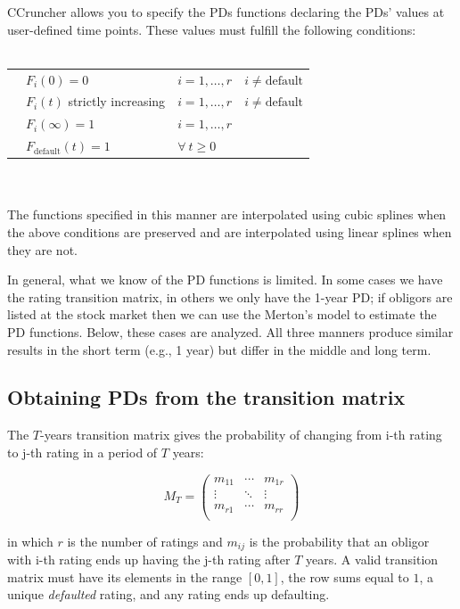 \documentclass[11pt,fleqn]{book} %
\begin{document}
CCruncher allows you to specify the PDs functions declaring the PDs' values 
at user-defined time points. These values must fulfill the following conditions:
~\\
~\\
\begin{listliketab} 
	\begin{tabular}{Lll}
		\textbullet & $F_i(0) = 0$                 & $i=1,\dots,r \quad i \ne \text{default}$ \\
		\textbullet & $F_i(t)$ strictly increasing & $i=1,\dots,r \quad i \ne \text{default}$ \\
		\textbullet & $F_i(\infty) = 1$            & $i=1,\dots,r$ \\
		\textbullet & $F_{\text{default}}(t) = 1$  & $\forall\ t \ge 0$ \\
	\end{tabular} 
\end{listliketab}
~\\
~\\
The functions specified in this manner are interpolated using cubic splines
when the above conditions are preserved and are interpolated using linear 
splines when they are not.

In general, what we know of the PD functions is limited. In some cases we have 
the rating transition matrix, in others we only have the 1-year PD; if obligors 
are listed at the stock market then we can use the Merton's model to estimate the 
PD functions. Below, these cases are analyzed. All three manners produce 
similar results in the short term (e.g., 1 year) but differ in the middle and
long term.

\subsection{Obtaining PDs from the transition matrix}
\label{pdftm}

\begin{definition}
	\label{def:tm}
	The $T$-years transition matrix gives the probability of changing 
	from i-th rating to j-th rating in a period of $T$ years:
	{\small
	\begin{displaymath}
		M_T = \left(
		\begin{array}{ccc}
			m_{11} & \cdots & m_{1r} \\
			\vdots & \ddots & \vdots \\
			m_{r1} & \cdots & m_{rr} \\
		\end{array}
		\right)
	\end{displaymath}\par}
	in which $r$ is the number of ratings and $m_{ij}$ is the probability that 
	an obligor with i-th rating ends up having the j-th rating after $T$ years.
	A valid transition matrix must have its elements in the range $[0,1]$, the 
	row sums equal to $1$, a unique \emph{defaulted} rating, and any rating 
	ends up defaulting.
\end{definition}
\end{document}
